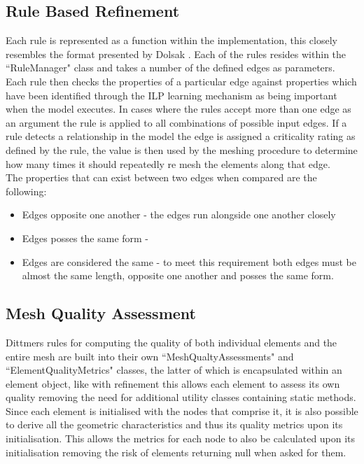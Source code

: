 \subsection{Rule Based Refinement}
Each rule is represented as a function within the implementation, this closely resembles the format presented by Dolsak \cite{DolsakPaper91, DolsakPaper94, appOfILPToFEMeshDesign} \cite{ConsultRuleIntelltSystemFE}. Each of the rules resides within the ``RuleManager" class and takes a number of the defined edges as parameters. Each rule then checks the properties of a particular edge against properties which have been identified through the ILP learning mechanism as being important when the model executes. In cases where the rules accept more than one edge as an argument the rule is applied to all combinations of possible input edges. If a rule detects a relationship in the model the edge is assigned a criticality rating as defined by the rule, the value is then used by the meshing procedure to determine how many times it should repeatedly re mesh the elements along that edge. \\ 
 
The properties that can exist between two edges when compared are the following:
\begin{itemize}
\item Edges opposite one another - the edges run alongside one another closely
\item Edges posses the same form - 

\item Edges are considered the same - to meet this requirement both edges must be almost the same length, opposite one another and posses the same form.

\end{itemize}


\subsection{Mesh Quality Assessment}
Dittmers rules for computing the quality of both individual elements and the entire mesh are built into their own ``MeshQualtyAssessments" and ``ElementQualityMetrics" classes, the latter of which is encapsulated within an element object, like with refinement this allows each element to assess its own quality removing the need for additional utility classes containing static methods. \\

Since each element is initialised with the nodes that comprise it, it is also possible to derive all the geometric characteristics and thus its quality metrics upon its initialisation. This allows the metrics for each node to also be calculated upon its initialisation removing the risk of elements returning null when asked for them.

